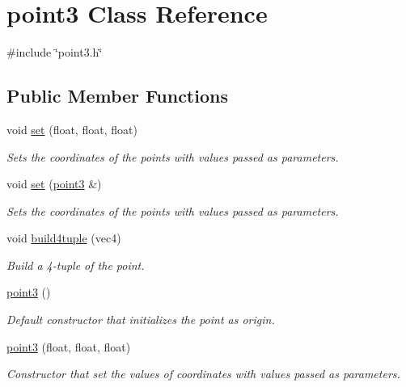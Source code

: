 \hypertarget{classpoint3}{}\section{point3 Class Reference}
\label{classpoint3}


{\ttfamily \#include \char`\"{}point3.\+h\char`\"{}}

\subsection*{Public Member Functions}
\begin{DoxyCompactItemize}
\item 
void \hyperlink{classpoint3_ac841fa40083190786715cea25a7485de}{set} (float, float, float)
\begin{DoxyCompactList}\small\item\em Sets the coordinates of the points with values passed as parameters. \end{DoxyCompactList}\item 
void \hyperlink{classpoint3_ae4720a1b5d2f9726015cff44948d3611}{set} (\hyperlink{classpoint3}{point3} \&)
\begin{DoxyCompactList}\small\item\em Sets the coordinates of the points with values passed as parameters. \end{DoxyCompactList}\item 
void \hyperlink{classpoint3_a88989a386ad528f15a04114b5a59173f}{build4tuple} (vec4)
\begin{DoxyCompactList}\small\item\em Build a 4-\/tuple of the point. \end{DoxyCompactList}\item 
\hyperlink{classpoint3_a4305b1c6999df0099b3b9e68ef9e5ae3}{point3} ()
\begin{DoxyCompactList}\small\item\em Default constructor that initializes the point as origin. \end{DoxyCompactList}\item 
\hyperlink{classpoint3_ac4734d7f9ab13ab6fd9189c71d057db3}{point3} (float, float, float)
\begin{DoxyCompactList}\small\item\em Constructor that set the values of coordinates with values passed as parameters. \end{DoxyCompactList}\end{DoxyCompactItemize}
